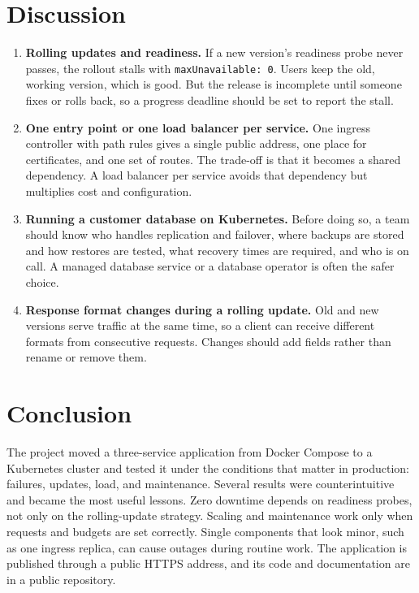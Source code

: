 \documentclass[11pt,a4paper]{article}
\begin{document}
\section{Discussion}
\begin{enumerate}[leftmargin=*]
  \item \textbf{Rolling updates and readiness.} If a new version's readiness probe never passes, the rollout stalls with \texttt{maxUnavailable: 0}. Users keep the old, working version, which is good. But the release is incomplete until someone fixes or rolls back, so a progress deadline should be set to report the stall.
  \item \textbf{One entry point or one load balancer per service.} One ingress controller with path rules gives a single public address, one place for certificates, and one set of routes. The trade-off is that it becomes a shared dependency. A load balancer per service avoids that dependency but multiplies cost and configuration.
  \item \textbf{Running a customer database on Kubernetes.} Before doing so, a team should know who handles replication and failover, where backups are stored and how restores are tested, what recovery times are required, and who is on call. A managed database service or a database operator is often the safer choice.
  \item \textbf{Response format changes during a rolling update.} Old and new versions serve traffic at the same time, so a client can receive different formats from consecutive requests. Changes should add fields rather than rename or remove them.
\end{enumerate}

\section{Conclusion}
The project moved a three-service application from Docker Compose to a Kubernetes cluster and tested it under the conditions that matter in production: failures, updates, load, and maintenance. Several results were counterintuitive and became the most useful lessons. Zero downtime depends on readiness probes, not only on the rolling-update strategy. Scaling and maintenance work only when requests and budgets are set correctly. Single components that look minor, such as one ingress replica, can cause outages during routine work. The application is published through a public HTTPS address, and its code and documentation are in a public repository.
\end{document}
